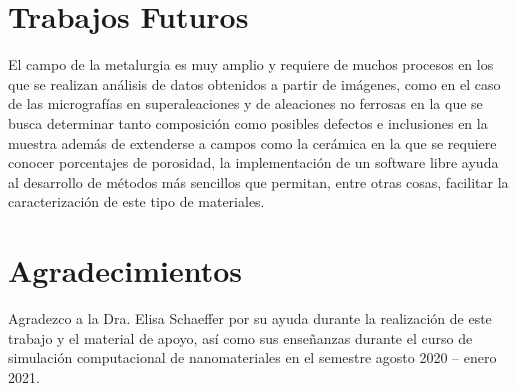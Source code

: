 \documentclass[12pt,twocolumn]{article}
\begin{document}
\section{Trabajos Futuros}

El campo de la metalurgia es muy amplio y requiere de muchos procesos en los que se realizan an\'alisis de datos obtenidos a partir de im\'agenes, como en el caso de las micrograf\'ias en superaleaciones y de aleaciones no ferrosas en la que se busca determinar tanto composici\'on como posibles defectos e inclusiones en la muestra adem\'as de extenderse a campos como la cer\'amica en la que se requiere conocer porcentajes de porosidad, la implementaci\'on de un software libre ayuda al desarrollo de m\'etodos m\'as sencillos que permitan, entre otras cosas, facilitar la caracterizaci\'on de este tipo de materiales.

\section{Agradecimientos}

Agradezco a la Dra. Elisa Schaeffer por su ayuda durante la realizaci\'on de este trabajo y el material de apoyo\cite{satuelisa}\cite{doctora}, as\'i como sus ense\~nanzas durante el curso de simulaci\'on computacional de nanomateriales en el semestre agosto 2020 -- enero 2021.



\end{document}
